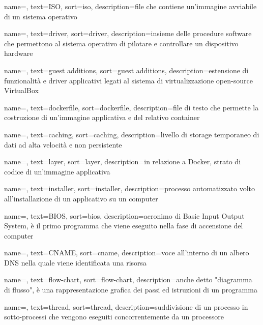 {
    name=,
    text=ISO,
    sort=iso, 
    description={file che contiene un'immagine avviabile di un sistema operativo}
}

{
    name=,
    text=driver,
    sort=driver, 
    description={insieme delle procedure software che permettono al sistema operativo di pilotare e controllare un dispositivo hardware}
}

{
    name=,
    text=guest additions,
    sort=guest additions, 
    description={estensione di funzionalità e driver applicativi legati al sistema di virtualizzazione open-source VirtualBox}
}

{
    name=,
    text=dockerfile,
    sort=dockerfile, 
    description={file di testo che permette la costruzione di un'immagine applicativa e del relativo container}
}

{
    name=,
    text=caching,
    sort=caching, 
    description={livello di storage temporaneo di dati ad alta velocità e non persistente}
}

{
    name=,
    text=layer,
    sort=layer, 
    description={in relazione a Docker, strato di codice di un'immagine applicativa}
}

{
    name=,
    text=installer,
    sort=installer, 
    description={processo automatizzato volto all'installazione di un applicativo su un computer}
}

{
    name=,
    text=BIOS,
    sort=bios, 
    description={acronimo di Basic Input Output System, è il primo programma che viene eseguito nella fase di accensione del computer}
}

{
    name=,
    text=CNAME,
    sort=cname, 
    description={voce all'interno di un albero DNS nella quale viene identificata una risorsa}
}

{
    name=,
    text=flow-chart,
    sort=flow-chart, 
    description={anche detto "diagramma di flusso", è una rappresentazione grafica dei passi ed istruzioni di un programma}
}

{
    name=,
    text=thread,
    sort=thread, 
    description={suddivisione di un processo in sotto-processi che vengono eseguiti concorrentemente da un processore}
}

